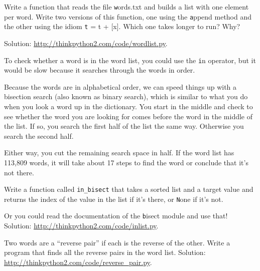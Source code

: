 \documentclass[
DIV=11,
fontsize=13,
twoside,
headinclude=false,
titlepage=firstiscover,
abstract=true,
headsepline=true,
footsepline=true,
chapterprefix=true, %
headings=big,
bibliography=totoc,%
captions=tableheading
]{scrbook}
\theoremstyle{definition}
\begin{document}
\begin{exercise}
\normalfont
{}

Write a function that reads the file {\texttt words.txt} and builds
a list with one element per word.  Write two versions of
this function, one using the {\texttt append} method and the
other using the idiom {\texttt t = t + [x]}.  Which one takes
longer to run?  Why?

Solution: \url{http://thinkpython2.com/code/wordlist.py}.

\end{exercise}


\begin{exercise}
\normalfont
\label{wordlist1}
\label{bisection}

To check whether a word is in the word list, you could use
the {\texttt in} operator, but it would be slow because it searches
through the words in order.

Because the words are in alphabetical order, we can speed things up
with a bisection search (also known as binary search), which is
similar to what you do when you look a word up in the dictionary.  You
start in the middle and check to see whether the word you are looking
for comes before the word in the middle of the list.  If so, you
search the first half of the list the same way.  Otherwise you search
the second half.

Either way, you cut the remaining search space in half.  If the
word list has 113,809 words, it will take about 17 steps to
find the word or conclude that it's not there.

Write a function called \verb"in_bisect" that takes a sorted list
and a target value and returns the index of the value
in the list if it's there, or {\texttt None} if it's not.

Or you could read the documentation of the {\texttt bisect} module
and use that!  Solution: \url{http://thinkpython2.com/code/inlist.py}.

\end{exercise}

\begin{exercise}
\normalfont
{}

Two words are a ``reverse pair'' if each is the reverse of the
other.  Write a program that finds all the reverse pairs in the
word list.  Solution: \url{http://thinkpython2.com/code/reverse_pair.py}.

\end{exercise}
\end{document}
